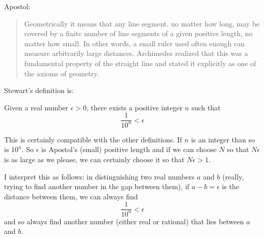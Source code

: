 \documentclass[11pt, oneside]{article}
\begin{document}
Apostol: 

\begin{quote}Geometrically it means that any line segment, no matter how long, may be covered by a finite number of line segments of a given positive length, no matter how small. In other words, a small ruler used often enough can measure arbitrarily large distances. Archimedes realized that this was a fundamental property of the straight line and stated it explicitly as one of the axioms of geometry.\end{quote}

Stewart's definition is:

Given a real number $\epsilon > 0$, there exists a positive integer $n$ such that
\[ \frac{1}{10^n} < \epsilon \]

This is certainly compatible with the other definitions.  If $n$ is an integer than so is $10^n$.  So $\epsilon$ is Apostol's (small) positive length and if we can choose $N$ so that $N \epsilon$ is as large as we please, we can certainly choose it so that $N \epsilon > 1$.

I interpret this as follows:  in distinguishing two real numbers $a$ and $b$ (really, trying to find another number in the gap between them), if $a - b = \epsilon$ is the distance between them, we can always find 
\[ \frac{1}{10^n} < \epsilon \]
and so always find another number (either real or rational) that lies between $a$ and $b$.
\end{document}
